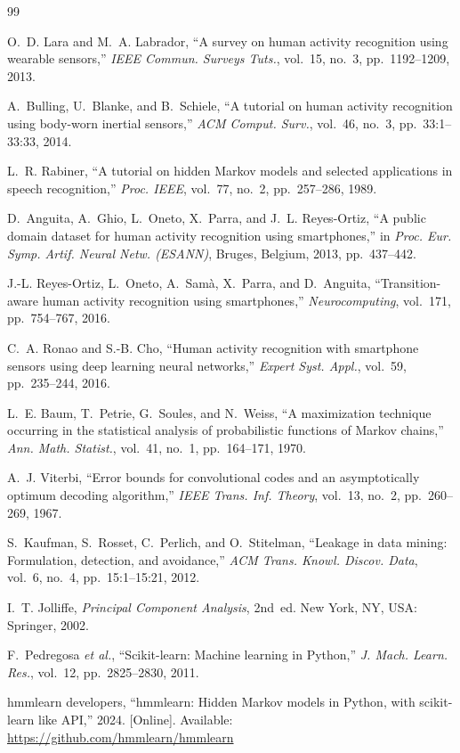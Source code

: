 \documentclass[conference]{IEEEtran}
\begin{document}
\begin{thebibliography}{99}

O.~D. Lara and M.~A. Labrador, ``A survey on human activity recognition using wearable sensors,'' \emph{IEEE Commun. Surveys Tuts.}, vol.~15, no.~3, pp.~1192--1209, 2013.

A.~Bulling, U.~Blanke, and B.~Schiele, ``A tutorial on human activity recognition using body-worn inertial sensors,'' \emph{ACM Comput. Surv.}, vol.~46, no.~3, pp.~33:1--33:33, 2014.

L.~R. Rabiner, ``A tutorial on hidden {M}arkov models and selected applications in speech recognition,'' \emph{Proc. IEEE}, vol.~77, no.~2, pp.~257--286, 1989.

D.~Anguita, A.~Ghio, L.~Oneto, X.~Parra, and J.~L. Reyes-Ortiz, ``A public domain dataset for human activity recognition using smartphones,'' in \emph{Proc. Eur. Symp. Artif. Neural Netw. (ESANN)}, Bruges, Belgium, 2013, pp.~437--442.

J.-L. Reyes-Ortiz, L.~Oneto, A.~Sam{\`a}, X.~Parra, and D.~Anguita, ``Transition-aware human activity recognition using smartphones,'' \emph{Neurocomputing}, vol.~171, pp.~754--767, 2016.

C.~A. Ronao and S.-B. Cho, ``Human activity recognition with smartphone sensors using deep learning neural networks,'' \emph{Expert Syst. Appl.}, vol.~59, pp.~235--244, 2016.

L.~E. Baum, T.~Petrie, G.~Soules, and N.~Weiss, ``A maximization technique occurring in the statistical analysis of probabilistic functions of {M}arkov chains,'' \emph{Ann. Math. Statist.}, vol.~41, no.~1, pp.~164--171, 1970.

A.~J. Viterbi, ``Error bounds for convolutional codes and an asymptotically optimum decoding algorithm,'' \emph{IEEE Trans. Inf. Theory}, vol.~13, no.~2, pp.~260--269, 1967.

S.~Kaufman, S.~Rosset, C.~Perlich, and O.~Stitelman, ``Leakage in data mining: Formulation, detection, and avoidance,'' \emph{ACM Trans. Knowl. Discov. Data}, vol.~6, no.~4, pp.~15:1--15:21, 2012.

I.~T. Jolliffe, \emph{Principal Component Analysis}, 2nd~ed. New York, NY, USA: Springer, 2002.

F.~Pedregosa \emph{et al.}, ``Scikit-learn: Machine learning in {P}ython,'' \emph{J. Mach. Learn. Res.}, vol.~12, pp.~2825--2830, 2011.

hmmlearn developers, ``hmmlearn: Hidden {M}arkov models in {P}ython, with scikit-learn like {API},'' 2024. [Online]. Available: \url{https://github.com/hmmlearn/hmmlearn}

\end{thebibliography}
\end{document}

